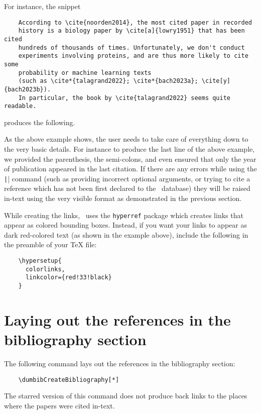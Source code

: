 \documentclass[letter, 12pt]{article}
\begin{document}
  For instance, the snippet
  \begin{verbatim}
    According to \cite{noorden2014}, the most cited paper in recorded
    history is a biology paper by \cite[a]{lowry1951} that has been cited
    hundreds of thousands of times. Unfortunately, we don't conduct
    experiments involving proteins, and are thus more likely to cite some
    probability or machine learning texts
    (such as \cite*{talagrand2022}; \cite*{bach2023a}; \cite[y]{bach2023b}).
    In particular, the book by \cite{talagrand2022} seems quite readable.
  \end{verbatim}
  produces the following.
  
  
  As the above example shows, the user needs to take care of everything down to the very basic details. For instance to produce the last line of the above example, we provided the parenthesis, the semi-colons, and even ensured that only the year of publication appeared in the last citation. If there are any errors while using the \texttt|\cite{}| command (such as providing incorrect optional arguments, or trying to cite a reference which has not been first declared to the \dumbib\ database) they will be raised in-text using the very visible format as demonstrated in the previous section.

  While creating the links, \dumbib\ uses the \texttt{hyperref} package which creates links that appear as colored bounding boxes. Instead, if you want your links to appear as dark red-colored text (as shown in the example above), include the following in the preamble of your \TeX{} file:
  \begin{verbatim}
    \hypersetup{
      colorlinks,
      linkcolor={red!33!black}
    }
  \end{verbatim}

  \section{Laying out the references in the bibliography section}
  The following command lays out the references in the bibliography section:
  \begin{verbatim}
    \dumbibCreateBibliography[*]
  \end{verbatim}
  The starred version of this command does not produce back links to the places where the papers were cited in-text.
\end{document}
